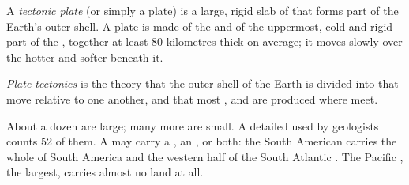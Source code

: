 \begin{definition}\label{def:g7:plate-tectonics:plate}
A \emph{tectonic plate} (or simply a plate) is a
large, rigid slab of  that forms part of the Earth's outer shell. A
plate is made of the  and of the uppermost, cold and rigid part of the
, together at least 80 kilometres thick on average; it moves slowly
over the hotter and softer  beneath it.
\end{definition}

\begin{definition}\label{def:g7:plate-tectonics:plate-tectonics}
\emph{Plate tectonics} is the theory that the outer
shell of the Earth is divided into  that move relative to one
another, and that most ,  and  are
produced where  meet.
\end{definition}

\begin{remark}\label{rem:g7:plate-tectonics:how-many}
About a dozen  are large; many more are small. A detailed  used by
geologists counts 52 of them. A  may carry a , an , or
both: the South American  carries the whole of South America and the
western half of the South Atlantic . The Pacific , the largest,
carries almost no land at all.
\end{remark}

